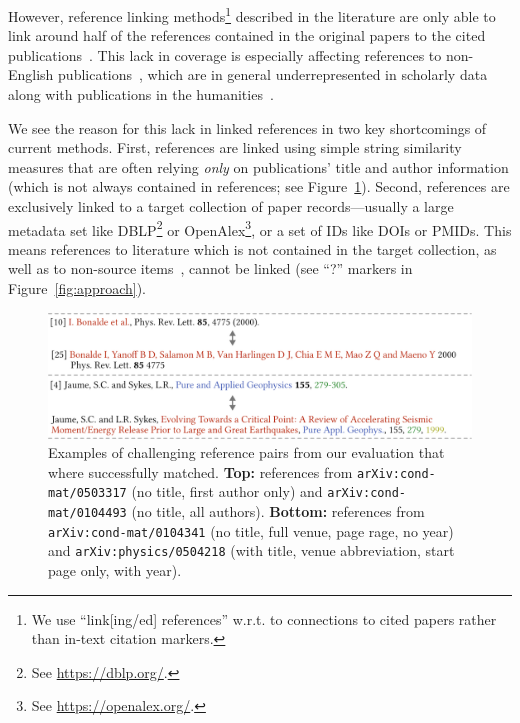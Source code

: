 However, reference linking methods\footnote{We use ``link[ing/ed] references'' w.r.t. to connections to cited papers rather than in-text citation markers.} described in the literature are only able to link around half of the references contained in the original papers to the cited publications~\cite{Lo2020,Saier2020}. This lack in coverage is especially affecting references to non-English publications~\cite{Saier2021}, which are in general underrepresented in scholarly data~\cite{Vera-Baceta2019,Liu2019,Moed2018,Moskaleva2019} along with publications in the humanities~\cite{Colavizza2019,Kellsey2004}.

We see the reason for this lack in linked references in two key shortcomings of current methods.
First, references are linked using simple string similarity measures that are often relying \emph{only} on publications' title and author information (which is not always contained in references; see Figure~\ref{fig:hardmatch}). %
Second, references are exclusively linked to a target collection of paper records---usually a large metadata set like DBLP\footnote{See \url{https://dblp.org/}.} or OpenAlex\footnote{See \url{https://openalex.org/}.}, or a set of IDs like DOIs or PMIDs. This means references to literature which is not contained in the target collection, as well as to non-source items~\cite{Chi2014}, cannot be linked (see ``?'' markers in Figure~\ref{fig:approach}).

\begin{figure}[tb]
  \centering
  \includegraphics[width=\linewidth]{figures/ref_covgran/hardmatch_examples.pdf}
  \caption{Examples of challenging reference pairs from our evaluation that where successfully matched. \textbf{Top:} references from \texttt{arXiv:cond-mat/0503317} (no title, first author only) and \texttt{arXiv:cond-mat/0104493} (no title, all authors). \textbf{Bottom:} references from \texttt{arXiv:cond-mat/0104341} (no title, full venue, page rage, no year) and \texttt{arXiv:physics/0504218} (with title, venue abbreviation, start page only, with year).}
  \label{fig:hardmatch}
\end{figure}


